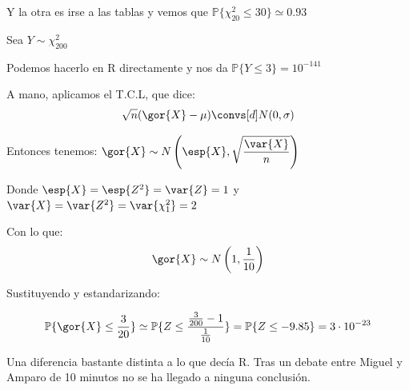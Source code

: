 \begin{problem}[3]
Y la otra es irse a las tablas y vemos que $\mathbb{P}\{\chi^2_{20} \leq 30\} \simeq 0.93$

\spart Sea $Y \sim \chi_{200}^2$ 

Podemos hacerlo en R directamente y nos da $\mathbb{P}\{Y\leq 3\} = 10 ^{-141}$

A mano, aplicamos el T.C.L, que dice:
\[\sqrt{n}(\gor{X} - \mu) \convs[d] N(0,\sigma)  \]

Entonces tenemos: $\gor{X} \sim N\left(\esp{X},\displaystyle \sqrt{\frac{\var{X}}{n}}\right)$

Donde $\esp{X} = \esp{Z^2} = \var{Z} = 1$ y $\var{X} = \var{Z^2} = \var{\chi_1^2} = 2$

Con lo que:
\[\gor{X} \sim N\left(1,\frac{1}{10}\right)\]

Sustituyendo y estandarizando:

\[
\mathbb{P}\{\gor{X}\leq\frac{3}{20} \} \simeq \mathbb{P} \{Z\leq \frac{\frac{3}{200} - 1}{\frac{1}{10}} \} = \mathbb{P} \{Z\leq -9.85\} = 3 \cdot 10^{-23}
\]

Una diferencia bastante distinta a lo que decía R. Tras un debate entre Miguel y Amparo de 10 minutos no se ha llegado a ninguna conclusión.
\end{problem}

